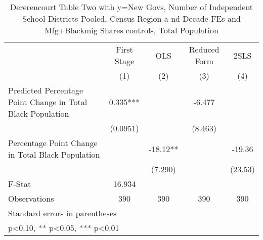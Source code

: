 \begin{table}[htbp]\centering
\def\sym#1{\ifmmode^{#1}\else\(^{#1}\)\fi}
\caption{Dererencourt Table Two with y=New Govs, Number of Independent School Districts  Pooled, Census Region a nd Decade FEs and Mfg+Blackmig Shares controls, Total Population}
\begin{tabular}{l*{4}{c}}
\toprule
                    & First Stage   &         OLS   &Reduced Form   &        2SLS   \\
                    &\multicolumn{1}{c}{(1)}   &\multicolumn{1}{c}{(2)}   &\multicolumn{1}{c}{(3)}   &\multicolumn{1}{c}{(4)}   \\
\midrule
Predicted Percentage Point Change in Total Black Population&       0.335***&               &      -6.477   &               \\
                    &    (0.0951)   &               &     (8.463)   &               \\
\addlinespace
Percentage Point Change in Total Black Population&               &      -18.12** &               &      -19.36   \\
                    &               &     (7.290)   &               &     (23.53)   \\
\midrule
F-Stat              &      16.934   &               &               &               \\
Observations        &         390   &         390   &         390   &         390   \\
\bottomrule
\multicolumn{5}{l}{\footnotesize Standard errors in parentheses}\\
\multicolumn{5}{l}{\footnotesize * p<0.10, ** p<0.05, *** p<0.01}\\
\end{tabular}
\end{table}
